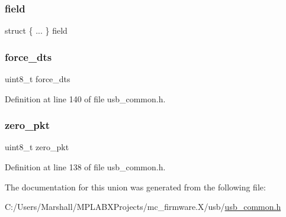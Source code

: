 \subsubsection{\texorpdfstring{field}{field}}
{\footnotesize\ttfamily struct \{ ... \}  field}

\mbox{\label{union_t_r_a_n_s_f_e_r___f_l_a_g_s_a905113be5625941ed80e4710f60fe7ef}} 
\subsubsection{\texorpdfstring{force\_dts}{force\_dts}}
{\footnotesize\ttfamily uint8\+\_\+t force\+\_\+dts}



Definition at line 140 of file usb\+\_\+common.\+h.

\mbox{\label{union_t_r_a_n_s_f_e_r___f_l_a_g_s_a3dbf03d72e11e17778bca583ab0381cf}} 
\subsubsection{\texorpdfstring{zero\_pkt}{zero\_pkt}}
{\footnotesize\ttfamily uint8\+\_\+t zero\+\_\+pkt}



Definition at line 138 of file usb\+\_\+common.\+h.



The documentation for this union was generated from the following file\+:\begin{DoxyCompactItemize}
\item 
C\+:/\+Users/\+Marshall/\+M\+P\+L\+A\+B\+X\+Projects/mc\+\_\+firmware.\+X/usb/\mbox{\hyperlink{usb__common_8h}{usb\+\_\+common.\+h}}\end{DoxyCompactItemize}
